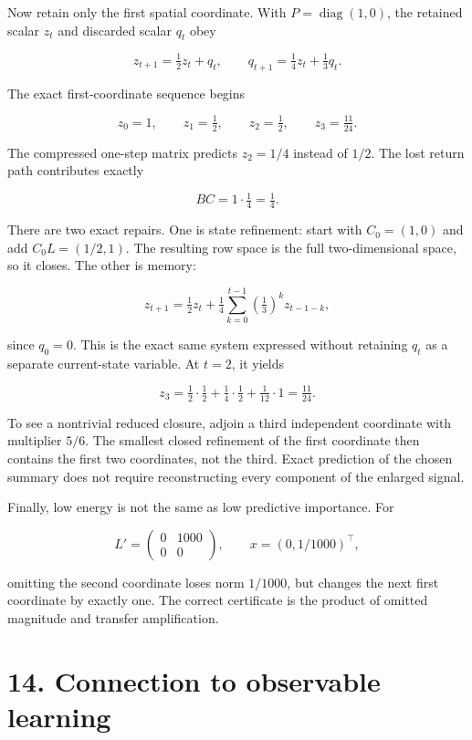 \documentclass[11pt,letterpaper]{article}
\begin{document}
Now retain only the first spatial coordinate. With
\(P=\operatorname{diag}(1,0)\), the retained scalar \(z_t\) and
discarded scalar \(q_t\) obey

\[
z_{t+1}=\tfrac12z_t+q_t,\qquad
q_{t+1}=\tfrac14z_t+\tfrac13q_t.
\]

The exact first-coordinate sequence begins

\[
z_0=1,\qquad z_1=\tfrac12,\qquad z_2=\tfrac12,
\qquad z_3=\tfrac{11}{24}.
\]

The compressed one-step matrix predicts \(z_2=1/4\) instead of \(1/2\).
The lost return path contributes exactly

\[
BC=1\cdot\tfrac14=\tfrac14.
\]

There are two exact repairs. One is state refinement: start with
\(C_0=(1,0)\) and add \(C_0L=(1/2,1)\). The resulting row space is the
full two-dimensional space, so it closes. The other is memory:

\[
z_{t+1}=\tfrac12z_t+
\tfrac14\sum_{k=0}^{t-1}\left(\tfrac13\right)^kz_{t-1-k},
\]

since \(q_0=0\). This is the exact same system expressed without
retaining \(q_t\) as a separate current-state variable. At \(t=2\), it
yields

\[
z_3=\tfrac12\cdot\tfrac12
+\tfrac14\cdot\tfrac12
+\tfrac1{12}\cdot1
=\tfrac{11}{24}.
\]

To see a nontrivial reduced closure, adjoin a third independent
coordinate with multiplier \(5/6\). The smallest closed refinement of
the first coordinate then contains the first two coordinates, not the
third. Exact prediction of the chosen summary does not require
reconstructing every component of the enlarged signal.

Finally, low energy is not the same as low predictive importance. For

\[
L'=\begin{pmatrix}0&1000\\0&0\end{pmatrix},
\qquad x=(0,1/1000)^\top,
\]

omitting the second coordinate loses norm \(1/1000\), but changes the
next first coordinate by exactly one. The correct certificate is the
product of omitted magnitude and transfer amplification.

\section{14. Connection to observable
learning}\label{connection-to-observable-learning}
\end{document}
